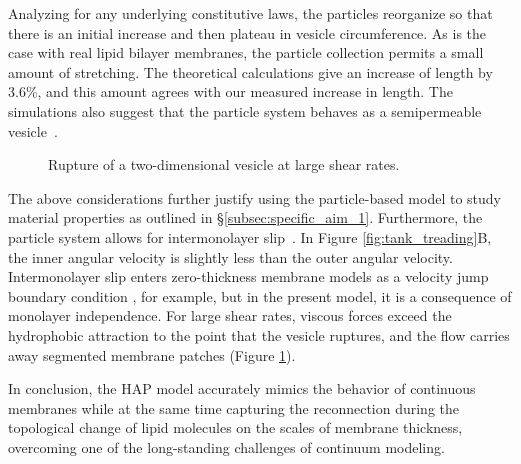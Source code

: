 Analyzing for any underlying constitutive laws, the particles reorganize
so that there is an initial increase and then plateau in vesicle
circumference. As is the case with real lipid bilayer membranes, the
particle collection permits a small amount of stretching. The
theoretical calculations give an increase of length by 3.6\%, and this amount
agrees with our measured increase in length. The simulations also
suggest that the particle system behaves as a semipermeable
vesicle~\cite{323e9a2f0c58487ea82518d7a1f96485, YAO2017728}.


\begin{figure}
 \vspace{-5pt}
  \caption{\label{fig:flow_rupture} \footnotesize Rupture of a
  two-dimensional vesicle at large shear rates.}
\end{figure}
The above considerations further justify using the particle-based model
to study material properties as outlined in
\S\ref{subsec:specific_aim_1}. Furthermore, the particle system allows
for intermonolayer slip~\cite{SHKULIPA2005823, ShkulipaThesis}. In
Figure \ref{fig:tank_treading}B, the inner angular velocity is slightly
less than the outer angular velocity. Intermonolayer slip enters
zero-thickness membrane models as a velocity jump boundary condition
\cite{schwalbe_vlahovska_miksis_2010}, for example, but in the present
model, it is a consequence of monolayer independence. For large shear
rates, viscous forces exceed the hydrophobic attraction to the point that
the vesicle ruptures, and the flow carries away segmented membrane patches
(Figure \ref{fig:flow_rupture}). 

In conclusion, the HAP model accurately mimics the behavior of continuous
membranes while at the same time capturing the
reconnection during the topological change of 
lipid molecules on the scales of membrane thickness,
overcoming one of the long-standing challenges of continuum modeling.

